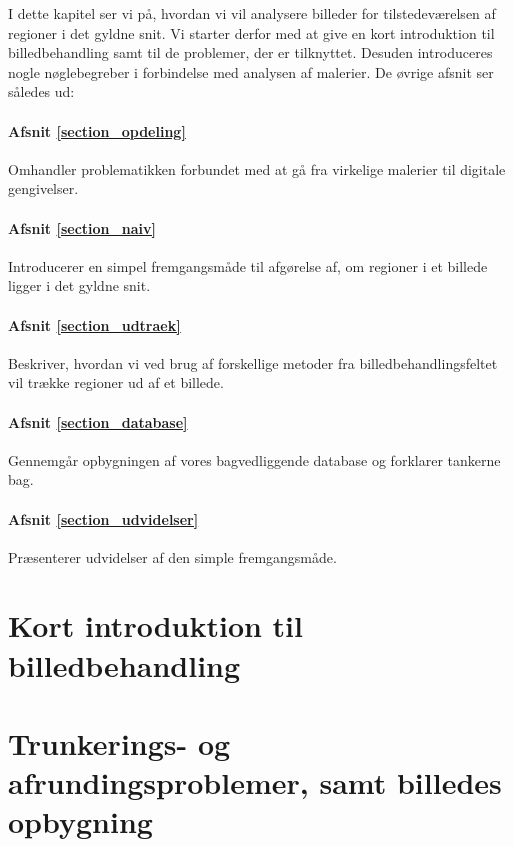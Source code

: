 {
{\sffamily I dette kapitel ser vi på, hvordan vi vil analysere billeder
for tilstedeværelsen af regioner i det gyldne snit. Vi starter derfor
med at give en kort introduktion til billedbehandling samt til de
problemer, der er tilknyttet. Desuden introduceres nogle nøglebegreber i
forbindelse med analysen af malerier. De øvrige afsnit ser således ud:


\paragraph{Afsnit \ref{section_opdeling}} Omhandler problematikken
forbundet med at gå fra virkelige malerier til digitale gengivelser.

\paragraph{Afsnit \ref{section_naiv}} Introducerer en simpel
fremgangsmåde til afgørelse af, om regioner i et billede ligger i det
gyldne snit.

\paragraph{Afsnit \ref{section_udtraek}} Beskriver, hvordan vi ved brug
af forskellige metoder fra billedbehandlingsfeltet vil trække regioner ud af
et billede.

\paragraph{Afsnit \ref{section_database}} Gennemgår opbygningen af vores
bagvedliggende database og forklarer tankerne bag.

\paragraph{Afsnit \ref{section_udvidelser}} Præsenterer udvidelser af
den simple fremgangsmåde.
}

\section{Kort introduktion til billedbehandling\label{section_kort_intro}}


\section{Trunkerings- og afrundingsproblemer, samt billedes opbygning\label{section_opdeling}}


}
